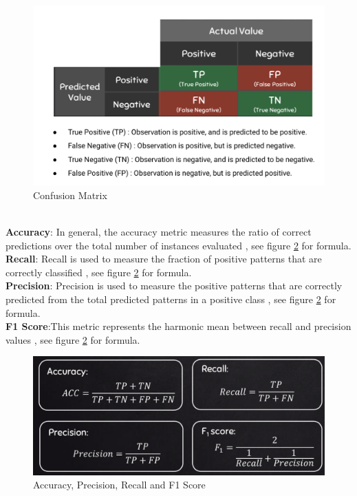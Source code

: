 \documentclass[format=sigconf]{acmart}
\begin{document}
\begin{figure}[H]
    \centering
    \includegraphics[scale=0.22]{images/confusion_matrix.png}
    \caption{Confusion Matrix}
    \label{fig:confusionmatrix}
\end{figure}
\hfill\\
\textbf{Accuracy}: In general, the accuracy metric measures the ratio of correct predictions over the total
number of instances evaluated \cite{hossin2015review}, see figure \ref{fig:aprf} for formula. \\
\textbf{Recall}: Recall is used to measure the fraction of positive patterns that are correctly classified \cite{hossin2015review}, 
see figure \ref{fig:aprf} for formula. \\
\textbf{Precision}: Precision is used to measure the positive patterns that are correctly predicted from the total predicted 
patterns in a positive class \cite{hossin2015review}, see figure \ref{fig:aprf} for formula. \\ 
\textbf{F1 Score}:This metric represents the harmonic mean between recall and precision values \cite{hossin2015review}, see figure 
\ref{fig:aprf} for formula. \\
\begin{figure}[H]
    \centering
    \includegraphics[scale=0.18]{images/evaluation_metrics_for_classification.png}
    \caption{Accuracy, Precision, Recall and F1 Score}
    \label{fig:aprf}
\end{figure}
\end{document}
